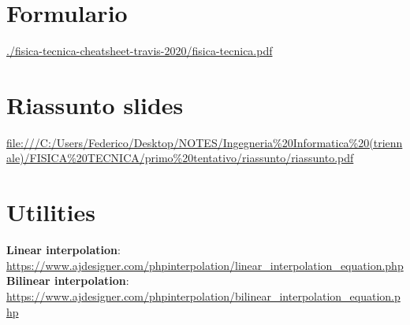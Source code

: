 \documentclass[a4paper, 9pt]{article}
\begin{document}
    \section{Formulario}
    \url{./fisica-tecnica-cheatsheet-travis-2020/fisica-tecnica.pdf}
    \section{Riassunto slides}
    \url{file:///C:/Users/Federico/Desktop/NOTES/Ingegneria%20Informatica%20(triennale)/FISICA%20TECNICA/primo%20tentativo/riassunto/riassunto.pdf}
    \section{Utilities}
    \textbf{Linear interpolation}: \url{https://www.ajdesigner.com/phpinterpolation/linear_interpolation_equation.php}\newline
    \newline
    \textbf{Bilinear interpolation}: \url{https://www.ajdesigner.com/phpinterpolation/bilinear_interpolation_equation.php}
\end{document}

